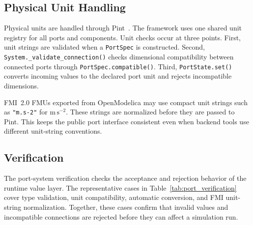 \subsection{Physical Unit Handling}
\label{sec:impl_units}

Physical units are handled through Pint~\cite{grecco_pint_2026}.
The framework uses one shared unit registry for all ports and components.
Unit checks occur at three points.
First, unit strings are validated when a \texttt{PortSpec} is constructed.
Second, \texttt{System.\_validate\_connection()} checks dimensional compatibility between connected ports through \texttt{PortSpec.compatible()}.
Third, \texttt{PortState.set()} converts incoming values to the declared port unit and rejects incompatible dimensions.

\ac{FMI}~2.0 \acp{FMU} exported from OpenModelica may use compact unit strings such as \texttt{"m.s-2"} for $\mathrm{m}\,\mathrm{s}^{-2}$.
These strings are normalized before they are passed to Pint.
This keeps the public port interface consistent even when backend tools use different unit-string conventions.

\subsection{Verification}

The port-system verification checks the acceptance and rejection behavior of the runtime value layer.
The representative cases in Table~\ref{tab:port_verification} cover type validation, unit compatibility, automatic conversion, and \ac{FMI} unit-string normalization.
Together, these cases confirm that invalid values and incompatible connections are rejected before they can affect a simulation run.

